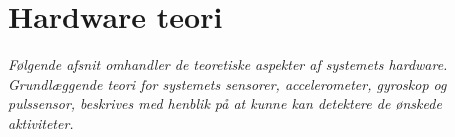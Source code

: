 \section{Hardware teori}
\textit{Følgende afsnit omhandler de teoretiske aspekter af systemets hardware. Grundlæggende teori for systemets sensorer, accelerometer, gyroskop og pulssensor, beskrives med henblik på at kunne kan detektere de ønskede aktiviteter.}
